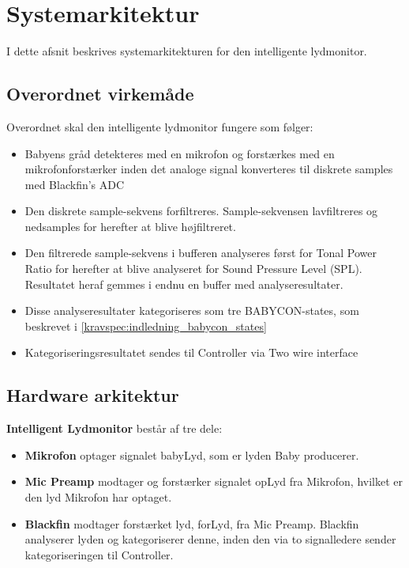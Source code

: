 \newpage
\section{Systemarkitektur}

I dette afsnit beskrives systemarkitekturen for den intelligente lydmonitor.

\subsection*{Overordnet virkemåde}
Overordnet skal den intelligente lydmonitor fungere som følger:
\begin{itemize}
	\item Babyens gråd detekteres med en mikrofon og forstærkes med en mikrofonforstærker inden det analoge signal konverteres til diskrete samples med Blackfin's ADC
	\item Den diskrete sample-sekvens forfiltreres. Sample-sekvensen lavfiltreres og nedsamples for herefter at blive højfiltreret. 
	\item Den filtrerede sample-sekvens i bufferen analyseres først for Tonal Power Ratio for herefter at blive analyseret for Sound Pressure Level (SPL). Resultatet heraf gemmes i endnu en buffer med analyseresultater.
	\item Disse analyseresultater kategoriseres som tre BABYCON-states, som beskrevet i \ref{kravspec:indledning_babycon_states} 
	\item Kategoriseringsresultatet sendes til Controller via Two wire interface
\end{itemize}


\newpage
\subsection{Hardware arkitektur}

\textbf{Intelligent Lydmonitor} består af tre dele: 
\begin{itemize}
\item \textbf{Mikrofon} optager signalet babyLyd, som er lyden Baby producerer. 
\item \textbf{Mic Preamp} modtager og forstærker signalet opLyd fra Mikrofon, hvilket er den lyd Mikrofon har optaget. 
\item \textbf{Blackfin} modtager forstærket lyd, forLyd, fra Mic Preamp. Blackfin analyserer lyden og kategoriserer denne, inden den via to signalledere sender kategoriseringen til Controller. 
\end{itemize}

